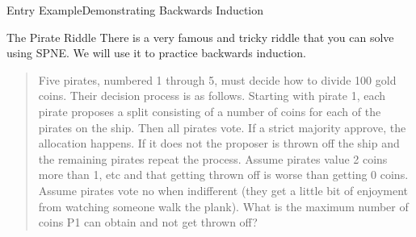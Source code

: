 \documentclass[aspectratio=169]{beamer}
\begin{document}
\begin{frame}{Entry Example}{Demonstrating Backwards Induction}

\end{frame}


\begin{frame}{The Pirate Riddle}
There is a very famous and tricky riddle that you can solve using SPNE. We will use it to practice backwards induction.
\begin{quote}
    Five pirates, numbered 1 through 5, must decide how to divide 100 gold coins. Their decision process is as follows. Starting with pirate 1, each pirate proposes a split consisting of a number of coins for each of the pirates on the ship. Then all pirates vote. If a strict majority approve, the allocation happens. If it does not the proposer is thrown off the ship and the remaining pirates repeat the process. Assume pirates value 2 coins more than 1, etc and that getting thrown off is worse than getting 0 coins. Assume pirates vote no when indifferent (they get a little bit of enjoyment from watching someone walk the plank). What is the maximum number of coins P1 can obtain and not get thrown off?
\end{quote}
    
\end{frame}
\end{document}
